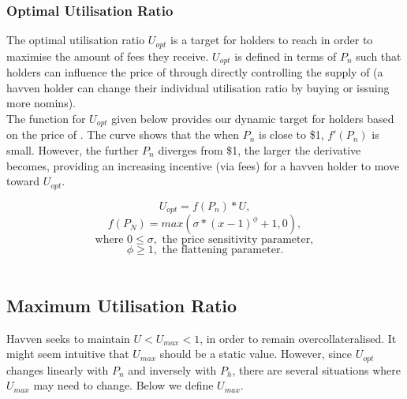 \subsubsection{Optimal Utilisation Ratio}

\noindent The optimal utilisation ratio $U_{opt}$ is a target for \HAV{} holders to reach in order to maximise the amount of fees they receive. $U_{opt}$ is defined in terms of $P_n$ such that \HAV{} holders can influence the price of \NOM{} through directly controlling the supply of \NOM{} (a havven holder can change their individual utilisation ratio by buying or issuing more nomins). \\
 
\noindent The function for $U_{opt}$ given below provides our dynamic target for \HAV{} holders based on the price of \NOM{}. The curve shows that the when $P_n$ is close to \$1, $ f'(P_n) $ is small. However, the further $P_n$ diverges from \$1, the larger the derivative becomes, providing an increasing incentive (via fees) for a havven holder to move toward $U_{opt}$.

$$ U_{opt} = f(P_n) * U,$$
$$ f(P_N) = max(\sigma * (x - 1)^{\phi} + 1, 0), $$
$$\text{where } 0 \leq \sigma, \text{ the price sensitivity parameter}, $$
$$\phi \geq 1, \text{ the flattening parameter}. $$ \\


\newpage

\subsection{Maximum Utilisation Ratio}

\noindent Havven seeks to maintain $U < U_{max} < 1$, in order to remain overcollateralised. It might seem intuitive that $U_{max}$ should be a static value. However, since $U_{opt}$ changes linearly with $P_n$ and inversely with $P_h$, there are several situations where $U_{max}$ may need to change. Below we define $U_{max}$. \\

